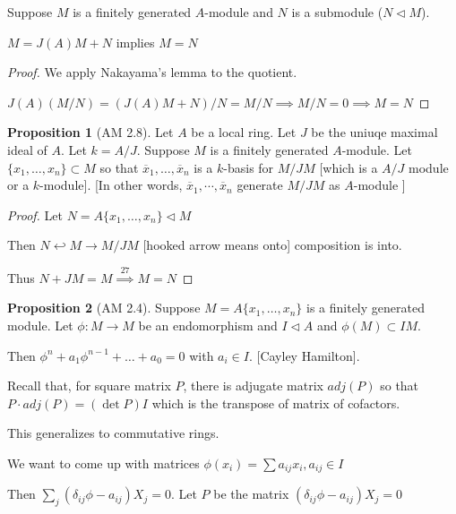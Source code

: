 \documentclass{article}
\theoremstyle{definition}
\newtheorem{proposition}{Proposition}
\begin{document}
Suppose \(M\) is a finitely generated \(A\)-module and \(N\) is a submodule (\(N \triangleleft M\)).

\(M = J(A)M + N\) implies \(M = N\) 

\begin{proof}
    We apply Nakayama's lemma to the quotient.

    \(J(A)(M / N) = (J(A)M + N) / N = M / N \implies M / N = 0 \implies M = N\) 
\end{proof}

\begin{proposition}
    [AM 2.8]

    Let \(A\) be a local ring. Let \(J\) be the uniuqe maximal ideal of \(A\). Let \(k = A / J\). Suppose \(M\) is a finitely generated \(A\)-module. Let \(\{ x_1, \dots , x_n \} \subset M\) so that \(\overline{x}_1, \dots , \overline{x}_n\) is a \(k\)-basis for \(M / JM\) [which is a \(A / J\) module or a \(k\)-module]. [In other words, \(\overline{x}_1,\cdots,\overline{x}_n\) generate \(M / JM\) as \(A\)-module ] 
\end{proposition}

\begin{proof}
    Let \(N = A \{ x_1, \dots ,x_n \} \triangleleft M\)
    
    Then \(N \hookleftarrow M \to M / JM\) [hooked arrow means onto] composition is into.

    Thus \(N + JM = M \overset{27}{\implies} M = N \)
    
    
\end{proof}

\begin{proposition}
    [AM 2.4]

    Suppose \(M = A \{ x_1, \dots ,x_n \} \) is a finitely generated module. Let \(\phi: M \to M\) be an endomorphism and \(I \triangleleft A\) and \(\phi(M) \subset IM\).

    Then \(\phi^n + a_1 \phi^{n-1} + \dots +a_0 = 0\) with \(a_i \in I\). [Cayley Hamilton].
\end{proposition}

Recall that, for square matrix \(P\), there is adjugate matrix \(adj(P)\) so that \(P \cdot adj(P) = (\det P) I\) which is the transpose of matrix of cofactors.

This generalizes to commutative rings.

We want to come up with matrices \(\phi(x_i) = \sum a_{ij}x_i, a_{ij}\in I \) 

Then \(\sum_{j} (\delta_{ij}\phi - a_{ij})X_j = 0\). Let \(P\) be the matrix \((\delta_{ij}\phi - a_{ij})X_j = 0\) 
\end{document}
